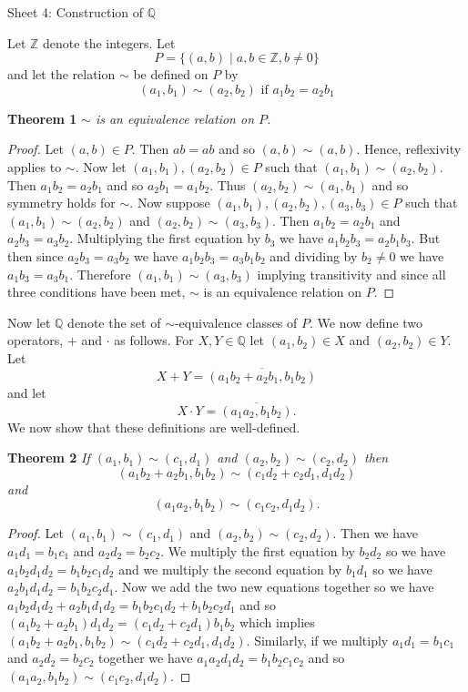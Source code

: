 \documentclass{article}
\begin{document}
\begin{flushleft}

\Large

Sheet 4: Construction of $\mathbb{Q}$\newline

\normalsize

Let $\mathbb{Z}$ denote the integers. Let
\[
P = \{(a,b) \mid a,b \in \mathbb{Z}, b \neq 0\}
\]
and let the relation $\sim$ be defined on $P$ by
\[
(a_1,b_1) \sim (a_2,b_2) \text{ if } a_1b_2=a_2b_1
\]

\textbf{Theorem 1}
\textsl{$\sim$ is an equivalence relation on $P$.}
\begin{proof}
Let $(a,b) \in P$. Then $ab=ab$ and so $(a,b) \sim (a,b)$. Hence, reflexivity applies to $\sim$. Now let $(a_1,b_1), (a_2,b_2) \in P$ such that $(a_1,b_1) \sim (a_2,b_2)$. Then $a_1b_2=a_2b_1$ and so $a_2b_1=a_1b_2$. Thus $(a_2,b_2) \sim (a_1,b_1)$ and so symmetry holds for $\sim$. Now suppose $(a_1,b_1), (a_2,b_2), (a_3,b_3) \in P$ such that $(a_1,b_1) \sim (a_2,b_2)$ and $(a_2,b_2) \sim (a_3,b_3)$. Then $a_1b_2=a_2b_1$ and $a_2b_3=a_3b_2$. Multiplying the first equation by $b_3$ we have $a_1b_2b_3=a_2b_1b_3$. But then since $a_2b_3=a_3b_2$ we have $a_1b_2b_3=a_3b_1b_2$ and dividing by $b_2 \neq 0$ we have $a_1b_3=a_3b_1$. Therefore $(a_1,b_1) \sim (a_3,b_3)$ implying transitivity and since all three conditions have been met, $\sim$ is an equivalence relation on $P$.
\end{proof}

Now let $\mathbb{Q}$ denote the set of $\sim$-equivalence classes of $P$. We now define two operators, $+$ and $\cdot$ as follows. For $X,Y \in \mathbb{Q}$ let $(a_1,b_2) \in X$ and $(a_2,b_2) \in Y$. Let
\[
X + Y = \overline{(a_1b_2 + a_2b_1,b_1b_2)}
\]
and let
\[
X \cdot Y = \overline{(a_1a_2,b_1b_2)}.
\]
We now show that these definitions are well-defined.\newline

\textbf{Theorem 2}
\textsl{If $(a_1,b_1) \sim (c_1,d_1)$ and $(a_2,b_2) \sim (c_2,d_2)$ then
\[
(a_1b_2+a_2b_1,b_1b_2) \sim (c_1d_2+c_2d_1,d_1d_2)
\]
and
\[
(a_1a_2,b_1b_2) \sim (c_1c_2,d_1d_2).
\]}
\begin{proof}
Let $(a_1,b_1) \sim (c_1,d_1)$ and $(a_2,b_2) \sim (c_2,d_2)$. Then we have $a_1d_1=b_1c_1$ and $a_2d_2=b_2c_2$. We multiply the first equation by $b_2d_2$ so we have $a_1b_2d_1d_2 = b_1b_2c_1d_2$ and we multiply the second equation by $b_1d_1$ so we have $a_2b_1d_1d_2 = b_1b_2c_2d_1$. Now we add the two new equations together so we have $a_1b_2d_1d_2 + a_2b_1d_1d_2 = b_1b_2c_1d_2 + b_1b_2c_2d_1$ and so $(a_1b_2+a_2b_1)d_1d_2 = (c_1d_2 + c_2d_1)b_1b_2$ which implies $(a_1b_2+a_2b_1,b_1b_2) \sim (c_1d_2+c_2d_1,d_1d_2)$. Similarly, if we multiply $a_1d_1=b_1c_1$ and $a_2d_2=b_2c_2$ together we have $a_1a_2d_1d_2=b_1b_2c_1c_2$ and so $(a_1a_2,b_1b_2) \sim (c_1c_2,d_1d_2)$.
\end{proof}


\end{flushleft}
\end{document}
